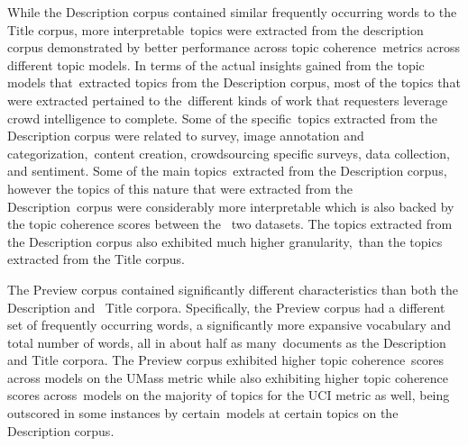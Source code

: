 \documentclass[letterpaper,12pt]{article}
\begin{document}
While the Description corpus contained similar frequently occurring words to the Title corpus, more interpretable\
topics were extracted from the description corpus demonstrated by better performance across topic coherence\
metrics across different topic models. In terms of the actual insights gained from the topic models that\
extracted topics from the Description corpus, most of the topics that were extracted pertained to the\
different kinds of work that requesters leverage crowd intelligence to complete. Some of the specific\
topics extracted from the Description corpus were related to survey, image annotation and categorization,\
content creation, crowdsourcing specific surveys, data collection, and sentiment. Some of the main topics\
extracted from the Description corpus, however the topics of this nature that were extracted from the Description\
corpus were considerably more interpretable which is also backed by the topic coherence scores between the \
two datasets. The topics extracted from the Description corpus also exhibited much higher granularity,\
than the topics extracted from the Title corpus.

The Preview corpus contained significantly different characteristics than both the Description and \
Title corpora. Specifically, the Preview corpus had a different set of frequently occurring words,
a significantly more expansive vocabulary and total number of words, all in about half as many\
documents as the Description and Title corpora. The Preview corpus exhibited higher topic coherence\
scores across models on the UMass metric while also exhibiting higher topic coherence scores across\
models on the majority of topics for the UCI metric as well, being outscored in some instances by certain\
models at certain topics on the Description corpus.
\end{document}
